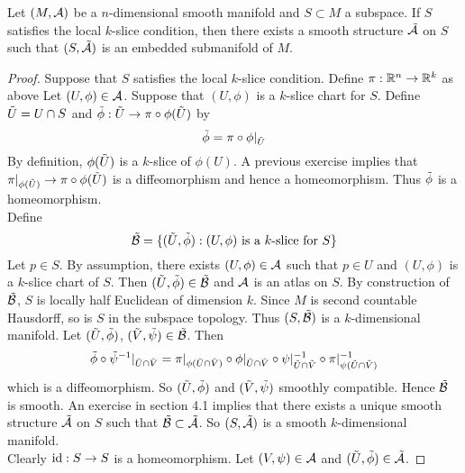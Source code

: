 \documentclass{book}
\begin{document}
	\begin{ex}
	Let $(M, \mathcal{A})$ be a $n$-dimensional smooth manifold and $S \subset M$ a subspace. If $S$ satisfies the local $k$-slice condition, then there exists a smooth structure $\tilde{\mathcal{A}}$ on $S$ such that $(S, \tilde{\mathcal{A}})$ is an embedded submanifold of $M$.
	\end{ex}	
	
	\begin{proof}
	Suppose that $S$ satisfies the local $k$-slice condition. Define $\pi: \mathbb{R}^n \rightarrow \mathbb{R}^k$ as above Let $(U, \phi) \in \mathcal{A}$. Suppose that $(U, \phi)$ is a $k$-slice chart for $S$. Define $\tilde{U} = U \cap S$ and $\tilde{\phi}: \tilde{U} \rightarrow \pi \circ \phi(\tilde{U})$ by $$\tilde{\phi} = \pi \circ \phi|_{\tilde{U}}$$ By definition, $\phi(\tilde{U})$ is a $k$-slice of $\phi(U)$. A previous exercise implies that $\pi|_{\phi(\tilde{U})} \rightarrow \pi \circ \phi(\tilde{U})$ is a diffeomorphism and hence a homeomorphism. Thus $\tilde{\phi}$ is a homeomorphism.\\
	Define $$\tilde{\mathcal{B}} = \{(\tilde{U}, \tilde{\phi}): (U, \phi) \text{ is a $k$-slice for $S$} \}$$
	Let $p \in S$. By assumption, there exists $(U, \phi) \in \mathcal{A}$ such that $p \in U$ and $(U, \phi)$ is a $k$-slice chart of $S$. Then $(\tilde{U}, \tilde{\phi}) \in \tilde{\mathcal{B}}$ and $\mathcal{A}$ is an atlas on $S$. By construction of $\tilde{\mathcal{B}}$, $S$ is locally half Euclidean of dimension $k$.  Since $M$ is second countable Hausdorff, so is $S$ in the subspace topology. Thus $(S, \tilde{\mathcal{B}})$ is a $k$-dimensional manifold.
	Let $(\tilde{U}, \tilde{\phi})$, $(\tilde{V}, \tilde{\psi}) \in \tilde{\mathcal{B}}$. Then
	$$\tilde{\phi} \circ \tilde{\psi}^{-1}|_{\tilde{U} \cap \tilde{V}} = \pi|_{\phi(\tilde{U} \cap \tilde{V})} \circ \phi|_{\tilde{U} \cap \tilde{V}} \circ \psi|_{\tilde{U} \cap \tilde{V}}^{-1} \circ \pi|_{\psi(\tilde{U} \cap \tilde{V})}^{-1} $$
	which is a diffeomorphism. So $(\tilde{U}, \tilde{\phi})$ and $(\tilde{V}, \tilde{\psi})$ smoothly compatible. Hence $\tilde{\mathcal{B}}$ is smooth. An exercise in section 4.1 implies that there exists a unique smooth structure $\tilde{\mathcal{A}}$ on $S$ such that $\tilde{\mathcal{B}} \subset \tilde{\mathcal{A}}$. So $(S, \tilde{\mathcal{A}})$ is a smooth $k$-dimensional manifold.\\
	Clearly $\operatorname{id}: S \rightarrow S$ is a homeomorphism. Let $(V, \psi) \in \mathcal{A}$ and $(\tilde{U}, \tilde{\phi}) \in \tilde{\mathcal{A}}$. 
	
	\end{proof}
	
	
	
	
	\begin{defn}
	
	\end{defn}	
	
	\begin{ex}
	
	\end{ex}	
	
\end{document}
